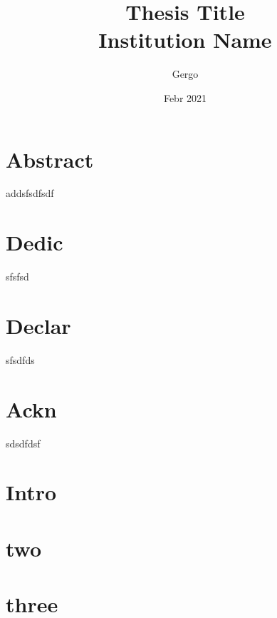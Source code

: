 \documentclass[12pt, twoside]{report}
\title{
	{Thesis Title}\\
	{\large Institution Name}
}
\author{Gergo}
\date{Febr 2021}
\begin{document}
\maketitle


\chapter*{Abstract}
addsfsdfsdf

\chapter*{Dedic}
sfsfsd

\chapter*{Declar}
sfsdfds

\chapter*{Ackn}
sdsdfdsf

\tableofcontents

\chapter{Intro}


\chapter{two}


\chapter{three}



\printbibliography
\end{document}
